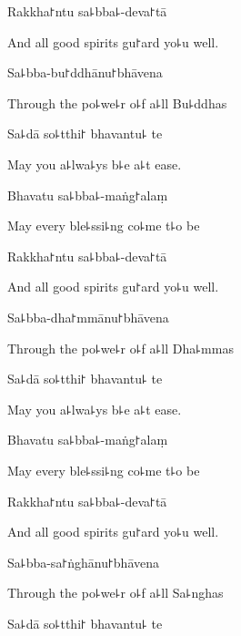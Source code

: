 Rakkha꜓ntu sa꜕bba꜕-deva꜓tā

\begin{english}
  And all good spirits gu꜓ard yo꜕u well.
\end{english}

Sa꜕bba-bu꜓ddhānu꜓bhāvena

\begin{english}
  Through the po꜕we꜕r o꜕f a꜕ll Bu꜕ddhas
\end{english}

Sa꜕dā so꜕tthi꜓ bhavantu꜕ te

\begin{english}
  May you a꜕lwa꜕ys b꜕e a꜕t ease.
\end{english}

Bhavatu sa꜕bba꜕-maṅg꜓alaṃ

\begin{english}
  May every ble꜕ssi꜕ng co꜕me t꜕o be
\end{english}

Rakkha꜓ntu sa꜕bba꜕-deva꜓tā

\begin{english}
  And all good spirits gu꜓ard yo꜕u well.
\end{english}

Sa꜕bba-dha꜓mmānu꜓bhāvena

\begin{english}
  Through the po꜕we꜕r o꜕f a꜕ll Dha꜕mmas
\end{english}

Sa꜕dā so꜕tthi꜓ bhavantu꜕ te

\begin{english}
  May you a꜕lwa꜕ys b꜕e a꜕t ease.
\end{english}

Bhavatu sa꜕bba꜕-maṅg꜓alaṃ

\begin{english}
  May every ble꜕ssi꜕ng co꜕me t꜕o be
\end{english}

Rakkha꜓ntu sa꜕bba꜕-deva꜓tā

\begin{english}
  And all good spirits gu꜓ard yo꜕u well.
\end{english}

Sa꜕bba-sa꜓ṅghānu꜓bhāvena

\begin{english}
  Through the po꜕we꜕r o꜕f a꜕ll Sa꜕nghas
\end{english}

Sa꜕dā so꜕tthi꜓ bhavantu꜕ te

